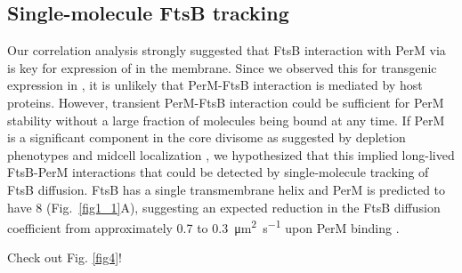 \documentclass[pdflatex,sn-basic]{sn-jnl}%
\begin{document}
\subsection{Single-molecule FtsB tracking}

Our correlation analysis strongly suggested that FtsB interaction with PerM via \ftsbH{} is key for expression of \permN{} in the membrane. Since we observed this for transgenic expression in \ec{}, it is unlikely that PerM-FtsB interaction is mediated by host proteins. However, transient PerM-FtsB interaction could be sufficient for PerM stability without a large fraction of molecules being bound at any time. If PerM is a significant component in the core \mtb{} divisome as suggested by depletion phenotypes and midcell localization \citep{goodsmithDisruptionTuberculosisMembrane2015, wangPersistentMycobacteriumTuberculosis2019}, we hypothesized that this implied long-lived FtsB-PerM interactions that could be detected by single-molecule tracking of FtsB diffusion. FtsB has a single transmembrane helix and PerM is predicted to have 8 (Fig.~\ref{fig1_1}A), suggesting an expected reduction in the FtsB diffusion coefficient from approximately 0.7 to \qty{0.3}{\square\um\per\s} upon PerM binding \citep{lucenaMicrodomainFormationGeneral2018}.

\loremipsum{}

Check out Fig. \ref{fig4}!
\end{document}
